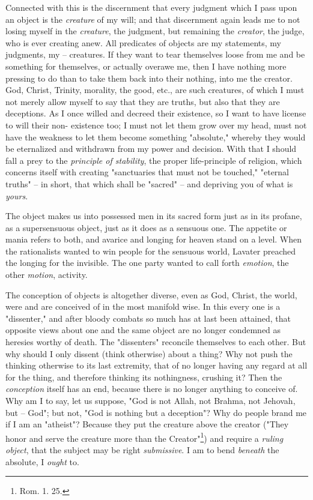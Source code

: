 Connected with this is the discernment that every judgment which I pass upon 
an object is the \textit{creature} of my will; and that discernment again 
leads me to not losing myself in the \textit{creature}, the judgment, but 
remaining the \textit{creator}, the judge, who is ever creating anew. All 
predicates of objects are my statements, my judgments, my -- creatures. If 
they want to tear themselves loose from me and be something for themselves, or 
actually overawe me, then I have nothing more pressing to do than to take them 
back into their nothing, into me the creator. God, Christ, Trinity, morality, 
the good, etc., are such creatures, of which I must not merely allow myself to 
say that they are truths, but also that they are deceptions. As I once willed 
and decreed their existence, so I want to have license to will their non- 
existence too; I must not let them grow over my head, must not have the 
weakness to let them become something "{}absolute,"{} whereby they would be 
eternalized and withdrawn from my power and decision. With that I should fall 
a prey to the \textit{principle of stability}, the proper life-principle of 
religion, which concerns itself with creating "{}sanctuaries that must not be 
touched,"{} "{}eternal truths"{} -- in short, that which shall be "{}sacred"{} 
-- and depriving you of what is \textit{yours}.

The object makes us into possessed men in its sacred form just as in its 
profane, as a supersensuous object, just as it does as a sensuous one. The 
appetite or mania refers to both, and avarice and longing for heaven stand on 
a level. When the rationalists wanted to win people for the sensuous world, 
Lavater preached the longing for the invisible. The one party wanted to call 
forth \textit{emotion}, the other \textit{motion}, activity.

 The conception of objects is altogether diverse, even as God, Christ, the 
world, were and are conceived of in the most manifold wise. In this every one 
is a "{}dissenter,"{} and after bloody combats so much has at last been 
attained, that opposite views about one and the same object are no longer 
condemned as heresies worthy of death. The "{}dissenters"{} reconcile 
themselves to each other. But why should I only dissent (think otherwise) 
about a thing? Why not push the thinking otherwise to its last extremity, that 
of no longer having any regard at all for the thing, and therefore thinking 
its nothingness, crushing it? Then the \textit{conception} itself has an end, 
because there is no longer anything to conceive of. Why am I to say, let us 
suppose, "{}God is not Allah, not Brahma, not Jehovah, but -- God"{}; but not, 
"{}God is nothing but a deception"{}? Why do people brand me if I am an 
"{}atheist"{}? Because they put the creature above the creator ("{}They honor 
and serve the creature more than the Creator"{}\footnote{Rom. 1. 25.}) and 
require a \textit{ruling object}, that the subject may be right 
\textit{submissive}. I am to bend \textit{beneath} the absolute, I 
\textit{ought} to.

